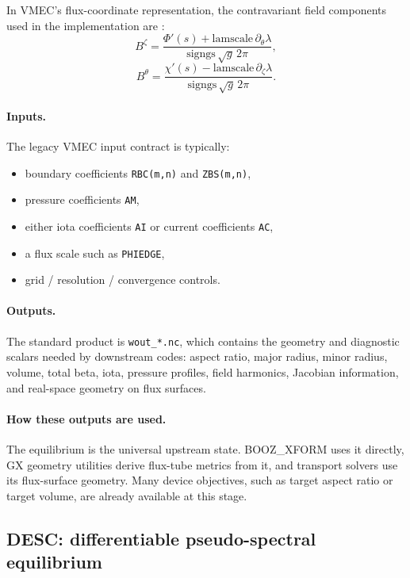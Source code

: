 \documentclass[11pt]{article}
\begin{document}
In VMEC's flux-coordinate representation, the contravariant field components
used in the implementation are \citep{VMECJaxRepo}:
\begin{equation}
B^\zeta = \frac{\Phi'(s) + \mathrm{lamscale}\,\partial_\theta \lambda}
{\mathrm{signgs}\,\sqrt{g}\,2\pi},
\end{equation}
\begin{equation}
B^\theta = \frac{\chi'(s) - \mathrm{lamscale}\,\partial_\zeta \lambda}
{\mathrm{signgs}\,\sqrt{g}\,2\pi}.
\end{equation}

\paragraph{Inputs.}
The legacy VMEC input contract is typically:
\begin{itemize}
  \item boundary coefficients \texttt{RBC(m,n)} and \texttt{ZBS(m,n)},
  \item pressure coefficients \texttt{AM},
  \item either iota coefficients \texttt{AI} or current coefficients \texttt{AC},
  \item a flux scale such as \texttt{PHIEDGE},
  \item grid / resolution / convergence controls.
\end{itemize}

\paragraph{Outputs.}
The standard product is \texttt{wout\_*.nc}, which contains the geometry and
diagnostic scalars needed by downstream codes: aspect ratio, major radius,
minor radius, volume, total beta, iota, pressure profiles, field harmonics,
Jacobian information, and real-space geometry on flux surfaces.

\paragraph{How these outputs are used.}
The equilibrium is the universal upstream state. BOOZ\_XFORM uses it directly,
GX geometry utilities derive flux-tube metrics from it, and transport solvers
use its flux-surface geometry. Many device objectives, such as target aspect
ratio or target volume, are already available at this stage.

\subsection{DESC: differentiable pseudo-spectral equilibrium}
\end{document}
